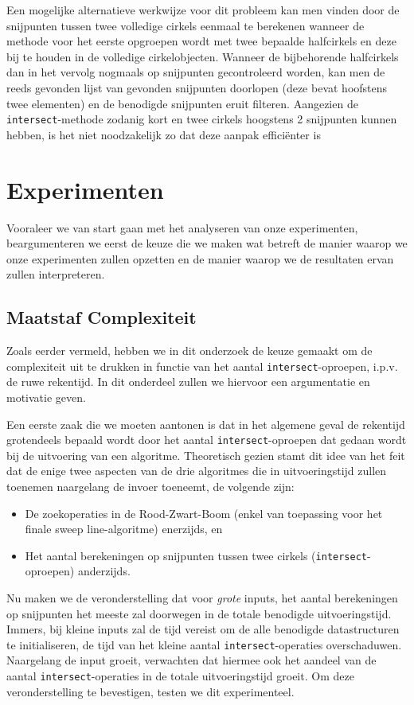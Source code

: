 \documentclass[12pt]{article}
\begin{document}
Een mogelijke alternatieve werkwijze voor dit probleem kan men vinden door de snijpunten tussen twee volledige cirkels eenmaal te berekenen wanneer de methode voor het eerste opgroepen wordt met twee bepaalde halfcirkels en deze bij te houden in de volledige cirkelobjecten. Wanneer de bijbehorende halfcirkels dan in het vervolg nogmaals op snijpunten gecontroleerd worden, kan men de reeds gevonden lijst van gevonden snijpunten doorlopen (deze bevat hoofstens twee elementen) en de benodigde snijpunten eruit filteren. Aangezien de \texttt{intersect}-methode zodanig kort en twee cirkels hoogstens 2 snijpunten kunnen hebben, is het niet noodzakelijk zo dat deze aanpak efficiënter is

\section{Experimenten}\label{sec:experimenten}
Vooraleer we van start gaan met het analyseren van onze experimenten, beargumenteren we eerst de keuze die we maken wat betreft de manier waarop we onze experimenten zullen opzetten en de manier waarop we de resultaten ervan zullen interpreteren.
\subsection{Maatstaf Complexiteit}\label{sec:maatstaf}
Zoals eerder vermeld, hebben we in dit onderzoek de keuze gemaakt om de complexiteit uit te drukken in functie van het aantal \texttt{intersect}-oproepen, i.p.v. de ruwe rekentijd. In dit onderdeel zullen we hiervoor een argumentatie en motivatie geven.

Een eerste zaak die we moeten aantonen is dat in het algemene geval de rekentijd grotendeels bepaald wordt door het aantal \texttt{intersect}-oproepen dat gedaan wordt bij de uitvoering van een algoritme. Theoretisch gezien stamt dit idee van het feit dat de enige twee aspecten van de drie algoritmes die in uitvoeringstijd zullen toenemen naargelang de invoer toeneemt, de volgende zijn:
\begin{itemize}
\item  De zoekoperaties in de Rood-Zwart-Boom (enkel van toepassing voor het finale sweep line-algoritme) enerzijds, en
\item  Het aantal berekeningen op snijpunten tussen twee cirkels (\texttt{intersect}-oproepen) anderzijds.
\end{itemize}

Nu maken we de veronderstelling dat voor \textit{grote} inputs, het aantal berekeningen op snijpunten het meeste zal doorwegen in de totale benodigde uitvoeringstijd. Immers, bij kleine inputs zal de tijd vereist om de alle benodigde datastructuren te initialiseren, de tijd van het kleine aantal \texttt{intersect}-operaties overschaduwen. Naargelang de input groeit, verwachten dat hiermee ook het aandeel van de aantal \texttt{intersect}-operaties in de totale uitvoeringstijd groeit. Om deze veronderstelling te bevestigen, testen we dit experimenteel.
\end{document}
